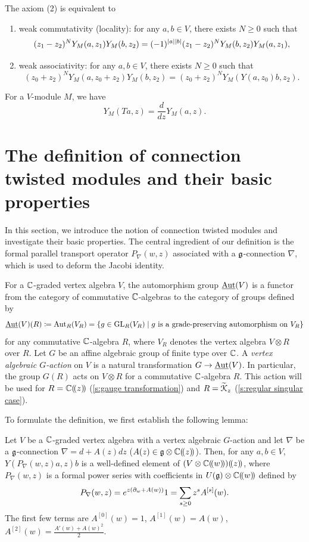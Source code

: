 \documentclass[final,reqno]{amsart}
\begin{document}
\begin{prp}\label{prp: axiommod}
    The axiom (2) is equivalent to
    \begin{enumerate}[label=(2-\arabic*)]
        \item 
        weak commutativity (locality): for any $a,b\in V$, there exists $N\geq 0$ such that
        \[
            (z_1-z_2)^NY_M(a,z_1)Y_M(b,z_2)=(-1)^{\left| a \right|\left| b \right|}(z_1-z_2)^NY_M(b,z_2)Y_M(a,z_1),
        \]
        \item
        weak associativity: for any $a,b\in V$, there exists $N\geq 0$ such that
        \[
            (z_0+z_2)^NY_M(a,z_0+z_2)Y_M(b,z_2)=(z_0+z_2)^NY_M(Y(a,z_0)b,z_2).
        \]
    \end{enumerate}
\end{prp}


\begin{prp}\label{prp: trans equiv mod}
    For a $V$-module $M$, we have
    \[
        Y_M(Ta,z)=\frac{d}{dz}Y_M(a,z).
    \]
\end{prp}


\section{The definition of connection twisted modules and their basic properties}\label{s:def and basic properties}

In this section, we introduce the notion of connection twisted modules and investigate their basic properties. The central ingredient of our definition is the formal parallel transport operator $P_\nabla(w,z)$ associated with a $\mathfrak{g}$-connection $\nabla$, which is used to deform the Jacobi identity.

For a $\mathbb{C}$-graded vertex algebra $V$, the automorphism group $\underline{\operatorname{Aut}}(V)$ is a functor from the category of commutative $\mathbb{C}$-algebras to the category of groups defined by
\[
    \underline{\operatorname{Aut}}(V)(R)\coloneqq\operatorname{Aut}_R(V_R)=\{g\in\operatorname{GL}_R(V_R)\mid g \text{ is a grade-preserving automorphism on } V_R\}
\]
for any commutative $\mathbb{C}$-algebra $R$, where $V_R$ denotes the vertex algebra $V\otimes R$ over $R$. Let $G$ be an affine algebraic group of finite type over $\mathbb{C}$. A \emph{vertex algebraic $G$-action} on $V$ is a natural transformation $G\to \underline{\operatorname{Aut}}(V)$. In particular, the group $G(R)$ acts on $V\otimes R$ for a commutative $\mathbb{C}$-algebra $R$. This action will be used for $R=\mathbb{C}(\!( z )\!)$ (\cref{s:gauge transformation}) and $R=\widetilde{\EuScript{K}}_z$ (\cref{s:regular singular case}). 

To formulate the definition, we first establish the following lemma:
\begin{lem}
    Let $V$ be a $\mathbb{C}$-graded vertex algebra with a vertex algebraic $G$-action and let $\nabla$ be a $\mathfrak{g}$-connection $\nabla=d+A(z)dz$ ($A(z)\in\mathfrak{g}\otimes\mathbb{C}(\!( z )\!)$). Then, for any $a,b\in V$, $Y(P_{\nabla}(w,z)a,z)b$ is a well-defined element of $(V\otimes\mathbb{C}(\!( w )\!))(\!( z )\!)$, where $P_{\nabla}(w,z)$ is a formal power series with coefficients in $U(\mathfrak{g})\otimes\mathbb{C}(\!( w )\!)$ defined by
    \[
        P_{\nabla}(w,z)=e^{z(\partial_w+A(w))}1=\sum_{s\geq 0}z^sA^{[s]}(w).
    \]
    The first few terms are $A^{[0]}(w)=1$, $A^{[1]}(w)=A(w)$, $A^{[2]}(w)=\frac{A'(w)+A(w)^2}{2}$.
\end{lem}
\end{document}
